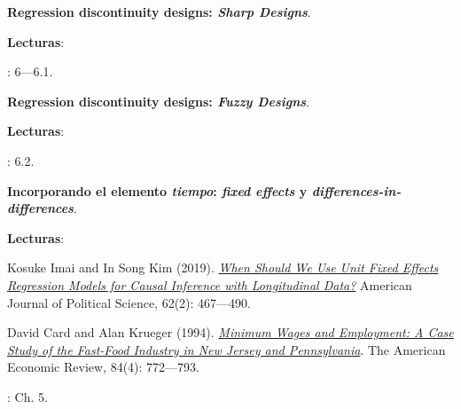 \documentclass[letterpaper]{article}
\renewenvironment{itemize}{
  \begin{list}{}{
    \setlength{\leftmargin}{1.5em}
  }
}{
  \end{list}
}
\begin{document}
\begin{enumerate}[label=\roman*.]
          \begin{itemize} 
            \item[4.] {\bf Regression discontinuity designs: \emph{Sharp Designs}}.
                \begin{itemize} 
                \item[$\circ$] {\bf Lecturas}: 
                  \begin{itemize} 
                    \item[$\diamond$] \textcite{Angrist2009}: 6---6.1.
                  \end{itemize}
                \end{itemize}
            \end{itemize}


            \begin{itemize} 
            \item[5.] {\bf Regression discontinuity designs: \emph{Fuzzy Designs}}.
                \begin{itemize} 
                \item[$\circ$] {\bf Lecturas}: 
                  \begin{itemize} 
                    \item[$\diamond$] \textcite{Angrist2009}: 6.2.
                  \end{itemize}
                \end{itemize}
            \end{itemize}


            \begin{itemize} 
            \item[6.] {\bf Incorporando el elemento \emph{tiempo}: \emph{fixed effects} y \emph{differences-in-differences}}.
                \begin{itemize} 
                \item[$\circ$] {\bf Lecturas}: 
                  \begin{itemize} 
                    \item[$\diamond$] Kosuke Imai and In Song Kim (2019). \href{https://github.com/hbahamonde/MLE/raw/master/Readings/Imai_FE.pdf}{\emph{When Should We Use Unit Fixed Effects Regression Models for Causal Inference with Longitudinal Data?}} American Journal of Political Science, 62(2): 467---490.
                    \item[$\diamond$] David Card and Alan Krueger (1994). \href{https://github.com/hbahamonde/MLE/raw/master/Readings/King.pdf}{\emph{Minimum Wages and Employment: A Case Study of the Fast-Food Industry in New Jersey and Pennsylvania}}. The American Economic Review, 84(4): 772---793.
                    \item[$\diamond$] \textcite{Angrist2009}: Ch. 5.
                  \end{itemize}
                \end{itemize}
            \end{itemize}


\end{enumerate}
\end{document}
